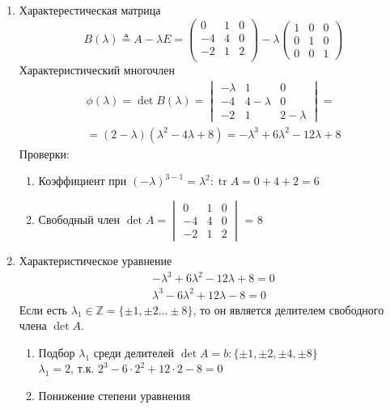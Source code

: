 \documentclass{article}
\DeclareMathOperator*{\Tr}{tr}
\begin{document}
\begin{enumerate}
	\item Характерестическая матрица
	\[
		B(\lambda) \triangleq A - \lambda E = \begin{pmatrix}
			0 & 1 & 0 \\
			-4 & 4 & 0 \\
			-2 & 1 & 2 \\
		\end{pmatrix} - \lambda \begin{pmatrix}
			1 & 0 & 0 \\
			0 & 1 & 0 \\
			0 & 0 & 1
		\end{pmatrix}
	\]
	Характеристический многочлен
	\begin{gather*}
		\phi (\lambda) = \det B(\lambda) = \begin{vmatrix}
			-\lambda & 1 & 0 \\
			-4 & 4 - \lambda & 0 \\
			-2 & 1 & 2 - \lambda
		\end{vmatrix} = \\
		= (2 - \lambda)(\lambda^2 - 4\lambda + 8) = -\lambda^3 + 6\lambda^2 - 12\lambda + 8
	\end{gather*}
	Проверки: \begin{enumerate}
		\item Коэффициент при $(-\lambda)^{3-1} = \lambda^2 : \Tr A = 0 + 4 + 2 = 6$
		\item Свободный член $\det A = \begin{vmatrix}
			0 & 1 & 0 \\
			-4 & 4 & 0 \\
			-2 & 1 & 2
		\end{vmatrix}$ = 8
	\end{enumerate}
	\item Характеристическое уравнение
	\begin{gather*}
		-\lambda^3 + 6\lambda^2 - 12\lambda + 8 = 0 \\
		\lambda^3 - 6\lambda^2 + 12\lambda - 8 = 0
	\end{gather*}
	Если есть $\lambda_1 \in \mathbb{Z} = \{ \pm 1, \pm 2 \dots \pm 8 \}$,
	то он является делителем свободного члена $\det A$.
	\begin{enumerate}
		\item Подбор $\lambda_1$ среди делителей $\det A = b : \{\pm 1, \pm 2, \pm 4, \pm 8 \}$ \\
		$\lambda_1 = 2$, т.к. $2^3 - 6 \cdot 2^2 + 12 \cdot 2 - 8 = 0$
		\item Понижение степени уравнения

\end{enumerate}
\end{enumerate}
\end{document}

